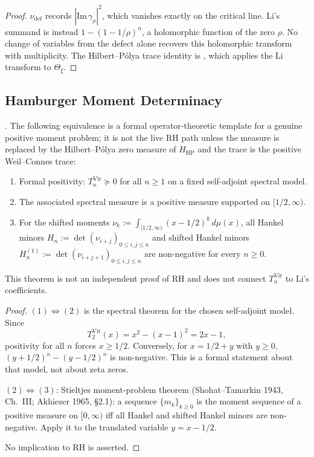 \begin{proof}
\(\nu_{\mathrm{def}}\) records \(|\mathrm{Im}\,\gamma_{\rho}|^{2}\),
which vanishes exactly on the critical line. Li's summand is instead
\(1-(1-1/\rho)^{n}\), a holomorphic function of the zero
\(\rho\). No change of variables from the defect alone recovers this
holomorphic transform with multiplicity. The Hilbert--P\'olya trace identity
is , which applies the Li
transform to \(\Theta_{\xi}\).
\end{proof}

\subsection{Hamburger Moment Determinacy}
\label{v4-arith:vb:hamburger}

\begin{theorem}
\label{v4-arith:vb:thm:moment-equivalence}
\ClaimStatusProvedHere. The following equivalence is a formal
operator-theoretic template for a genuine positive moment problem; it
is not the live RH path unless the measure is replaced by the
Hilbert--P\'olya zero measure of \(H_{\mathrm{HP}}\) and the trace
is the positive Weil--Connes trace:
\begin{enumerate}
\item Formal positivity: \(T_{n}^{\mathrm{Vir}}\succeq0\) for all
\(n\geq1\) on a fixed self-adjoint spectral model.
\item The associated spectral measure is a positive measure supported
on \([1/2,\infty)\).
\item For the shifted moments
\(\nu_{k}:=\int_{[1/2,\infty)}(x-1/2)^{k}\,d\mu(x)\), all Hankel
minors \(H_{n}:=\det(\nu_{i+j})_{0\leq i,j\leq n}\) and shifted Hankel
minors \(H_{n}^{(1)}:=\det(\nu_{i+j+1})_{0\leq i,j\leq n}\) are
non-negative for every \(n\geq0\).
\end{enumerate}
This theorem is not an independent proof of RH and does not connect
\(T_{n}^{\mathrm{Vir}}\) to Li's coefficients.
\end{theorem}

\begin{proof}
\((1)\Leftrightarrow(2)\) is the spectral theorem for the chosen
self-adjoint model.  Since
\[
T_{2}^{\mathrm{Vir}}(x)=x^{2}-(x-1)^{2}=2x-1,
\]
positivity for all \(n\) forces \(x\geq1/2\).  Conversely, for
\(x=1/2+y\) with \(y\geq0\),
\((y+1/2)^{n}-(y-1/2)^{n}\) is non-negative.  This is a formal
statement about that model, not about zeta zeros.

\((2)\Leftrightarrow(3)\): Stieltjes moment-problem theorem
(Shohat--Tamarkin 1943, Ch.~III; Akhiezer 1965, \S2.1): a sequence
\(\{m_{k}\}_{k\geq 0}\) is the moment sequence of a positive measure on
\([0,\infty)\) iff all Hankel and shifted Hankel minors are
non-negative.  Apply it to the translated variable \(y=x-1/2\).

No implication to RH is asserted.
\end{proof}

